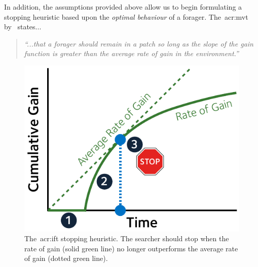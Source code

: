 In addition, the assumptions provided above allow us to begin formulating a stopping heuristic based upon the \emph{optimal behaviour} of a forager. The~\gls{acr:mvt} by~\cite{charnov1976mvt} states...

\begin{quote}
    \emph{``...that a forager should remain in a patch so long as the slope of the gain function is greater than the average rate of gain in the environment.''}
\end{quote}

\begin{figure}
    \begin{center}
    \vspace*{-7mm}
    \includegraphics[width=1\textwidth]{figures/ch3-ift_stop.pdf}
    \end{center}
    \vspace*{-4mm}
    \caption[Optimal \gls{acr:ift} stopping heuristic]{The~\gls{acr:ift} stopping heuristic. The searcher should stop when the rate of gain (solid {\color{dmax_green}green} line) no longer outperforms the average rate of gain (dotted {\color{dmax_green}green} line).}
    \label{fig:ift_stopping}
\end{figure}


